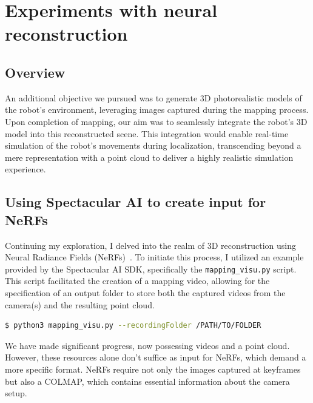\chapter{Experiments with neural reconstruction} \label{nerf_gsplat}

\section{Overview}


An additional objective we pursued was to generate 3D photorealistic models of the robot's environment, leveraging images captured during the mapping process. Upon completion of mapping, our aim was to seamlessly integrate the robot's 3D model into this reconstructed scene. This integration would enable real-time simulation of the robot's movements during localization, transcending beyond a mere representation with a point cloud to deliver a highly realistic simulation experience.

\section{Using Spectacular AI to create input for NeRFs}

Continuing my exploration, I delved into the realm of 3D reconstruction using Neural Radiance Fields (NeRFs)~\cite{nerf}. To initiate this process, I utilized an example provided by the Spectacular AI SDK, specifically the \verb|mapping_visu.py| script. This script facilitated the creation of a mapping video, allowing for the specification of an output folder to store both the captured videos from the camera(s) and the resulting point cloud.

\begin{lstlisting}[language=bash,frame=single,float=!ht]
$ python3 mapping_visu.py --recordingFolder /PATH/TO/FOLDER
\end{lstlisting}

We have made significant progress, now possessing videos and a point cloud. However, these resources alone don't suffice as input for NeRFs, which demand a more specific format. NeRFs require not only the images captured at keyframes but also a COLMAP, which contains essential information about the camera setup.

